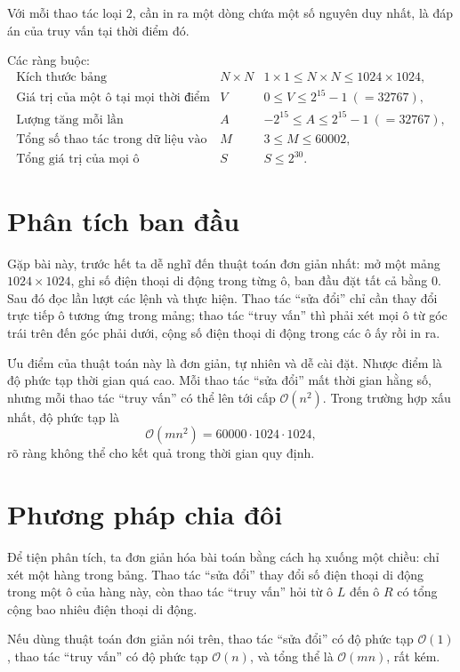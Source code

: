 \documentclass[11pt]{article}
\newcommand{\Oh}{\mathcal{O}}
\begin{document}
Với mỗi thao tác loại \(2\), cần in ra một dòng chứa một số nguyên duy nhất,
là đáp án của truy vấn tại thời điểm đó.

Các ràng buộc:
\[
\begin{array}{lll}
\text{Kích thước bảng} & N\times N &
  1\times 1\le N\times N\le 1024\times 1024,\\
\text{Giá trị của một ô tại mọi thời điểm} & V &
  0\le V\le 2^{15}-1\ (=32767),\\
\text{Lượng tăng mỗi lần} & A &
  -2^{15}\le A\le 2^{15}-1\ (=32767),\\
\text{Tổng số thao tác trong dữ liệu vào} & M &
  3\le M\le 60002,\\
\text{Tổng giá trị của mọi ô} & S &
  S\le 2^{30}.
\end{array}
\]

\section{Phân tích ban đầu}

Gặp bài này, trước hết ta dễ nghĩ đến thuật toán đơn giản nhất: mở một mảng
\(1024\times 1024\), ghi số điện thoại di động trong từng ô, ban đầu đặt tất
cả bằng \(0\). Sau đó đọc lần lượt các lệnh và thực hiện. Thao tác ``sửa đổi''
chỉ cần thay đổi trực tiếp ô tương ứng trong mảng; thao tác ``truy vấn'' thì
phải xét mọi ô từ góc trái trên đến góc phải dưới, cộng số điện thoại di động
trong các ô ấy rồi in ra.

Ưu điểm của thuật toán này là đơn giản, tự nhiên và dễ cài đặt. Nhược điểm là
độ phức tạp thời gian quá cao. Mỗi thao tác ``sửa đổi'' mất thời gian hằng số,
nhưng mỗi thao tác ``truy vấn'' có thể lên tới cấp \(\Oh(n^2)\). Trong trường
hợp xấu nhất, độ phức tạp là
\[
  \Oh(mn^2)=60000\cdot 1024\cdot 1024,
\]
rõ ràng không thể cho kết quả trong thời gian quy định.

\section{Phương pháp chia đôi}

Để tiện phân tích, ta đơn giản hóa bài toán bằng cách hạ xuống một chiều: chỉ
xét một hàng trong bảng. Thao tác ``sửa đổi'' thay đổi số điện thoại di động
trong một ô của hàng này, còn thao tác ``truy vấn'' hỏi từ ô \(L\) đến ô \(R\)
có tổng cộng bao nhiêu điện thoại di động.

Nếu dùng thuật toán đơn giản nói trên, thao tác ``sửa đổi'' có độ phức tạp
\(\Oh(1)\), thao tác ``truy vấn'' có độ phức tạp \(\Oh(n)\), và tổng thể là
\(\Oh(mn)\), rất kém.
\end{document}
